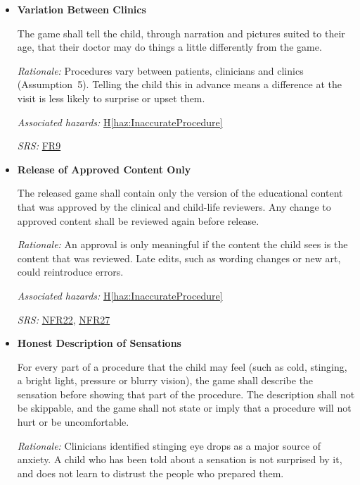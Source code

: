 \documentclass{article}
\newcounter{hazard}
\newcommand{\hazref}[1]{\hyperref[haz:#1]{H\ref*{haz:#1}}}
\newcounter{sr}
\newcommand{\srdef}[1]{\refstepcounter{sr}\label{sr:#1}\textbf{SR-\thesr:}}
\newcommand{\srsurl}{https://team-hindsight.github.io/ophthamology-game/SRS/SRS.pdf}
\newcommand{\srsfrref}[2]{\href{\srsurl\#nameddest=#1}{FR#2}}
\newcommand{\srsnfrref}[2]{\href{\srsurl\#nameddest=#1}{NFR#2}}
\begin{document}
\begin{itemize}[leftmargin=1.5cm, labelwidth=1.3cm, labelsep=0.2cm,
  align=left, itemsep=1.2em, parsep=0.6em]
\textit{Associated hazards:} \hazref{InaccurateProcedure}

\textit{SRS:} \srsnfrref{NFR_ClinicalAccuracy}{22}, \srsnfrref{NFR_Integrity}{27}

\item[\srdef{ClinicsDiffer}] \textbf{Variation Between Clinics}

The game shall tell the child, through narration and pictures suited to their age,
that their doctor may do things a little differently from the game.

\textit{Rationale:} Procedures vary between patients, clinicians and clinics
(Assumption~5). Telling the child this in advance means a difference at the
visit is less likely to surprise or upset them.

\textit{Associated hazards:} \hazref{InaccurateProcedure}

\textit{SRS:} \srsfrref{FR_ClinicsDiffer}{9}

\item[\srdef{ApprovedContent}] \textbf{Release of Approved Content Only}

The released game shall contain only the version of the educational content
that was approved by the clinical and child-life reviewers. Any change to
approved content shall be reviewed again before release.

\textit{Rationale:} An approval is only meaningful if the content the child
sees is the content that was reviewed. Late edits, such as wording changes or
new art, could reintroduce errors.

\textit{Associated hazards:} \hazref{InaccurateProcedure}

\textit{SRS:} \srsnfrref{NFR_ClinicalAccuracy}{22}, \srsnfrref{NFR_Integrity}{27}

\item[\srdef{HonestSensations}] \textbf{Honest Description of Sensations}

For every part of a procedure that the child may feel (such as cold, stinging,
a bright light, pressure or blurry vision), the game shall describe the
sensation before showing that part of the procedure. The description shall
not be skippable, and the game shall not state or imply that a procedure will
not hurt or be uncomfortable.

\textit{Rationale:} Clinicians identified stinging eye drops as a major source
of anxiety. A child who has been told about a sensation is not surprised by
it, and does not learn to distrust the people who prepared them.


\end{itemize}
\end{document}
